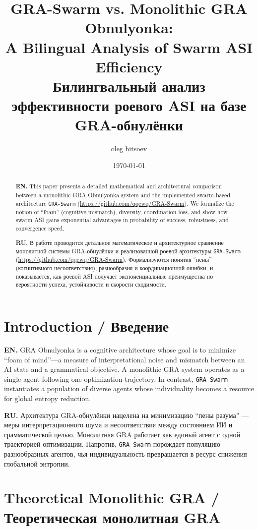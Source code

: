 \documentclass[11pt,a4paper]{article}
\title{%
GRA-Swarm vs. Monolithic GRA Obnulyonka:\\
\large A Bilingual Analysis of Swarm ASI Efficiency\\[4pt]
{\normalsize Билингвальный анализ эффективности роевого ASI на базе GRA-обнулёнки}
}
\author{oleg bitsoev}
\date{\today}
\begin{document}
\maketitle

\begin{abstract}
\textbf{EN.}
This paper presents a detailed mathematical and architectural comparison between a monolithic GRA Obnulyonka system and the implemented swarm-based architecture \texttt{GRA-Swarm} (\url{https://github.com/qqewq/GRA-Swarm}).
We formalize the notion of ``foam'' (cognitive mismatch), diversity, coordination loss, and show how swarm ASI gains exponential advantages in probability of success, robustness, and convergence speed.

\textbf{RU.}
В работе проводится детальное математическое и архитектурное сравнение монолитной системы GRA-обнулёнки и реализованной роевой архитектуры \texttt{GRA-Swarm} (\url{https://github.com/qqewq/GRA-Swarm}).
Формализуются понятия ``пены'' (когнитивного несоответствия), разнообразия и координационной ошибки, и показывается, как роевой ASI получает экспоненциальные преимущества по вероятности успеха, устойчивости и скорости сходимости.
\end{abstract}

\section{Introduction / Введение}

\textbf{EN.}
GRA Obnulyonka is a cognitive architecture whose goal is to minimize ``foam of mind''---a measure of interpretational noise and mismatch between an AI state and a grammatical objective.
A monolithic GRA system operates as a single agent following one optimization trajectory.
In contrast, \texttt{GRA-Swarm} instantiates a population of diverse agents whose individuality becomes a resource for global entropy reduction.

\textbf{RU.}
Архитектура GRA-обнулёнки нацелена на минимизацию ``пены разума'' --- меры интерпретационного шума и несоответствия между состоянием ИИ и грамматической целью.
Монолитная GRA работает как единый агент с одной траекторией оптимизации.
Напротив, \texttt{GRA-Swarm} порождает популяцию разнообразных агентов, чья индивидуальность превращается в ресурс снижения глобальной энтропии.

\section{Theoretical Monolithic GRA / Теоретическая монолитная GRA}
\end{document}
